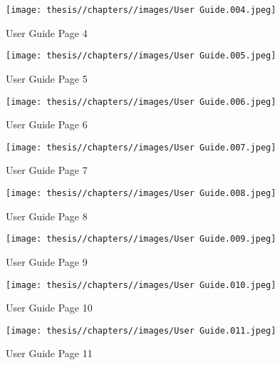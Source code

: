 \begin{figure} [H]
    \centering
    \texttt{[image: thesis//chapters//images/User Guide.004.jpeg]}
    \caption{User Guide Page 4}
 
\end{figure}

\begin{figure} [H]
    \centering
    \texttt{[image: thesis//chapters//images/User Guide.005.jpeg]}
    \caption{User Guide Page 5}
 
\end{figure}

\begin{figure} [H]
    \centering
    \texttt{[image: thesis//chapters//images/User Guide.006.jpeg]}
    \caption{User Guide Page 6}
 
\end{figure}

\begin{figure} [H]
    \centering
    \texttt{[image: thesis//chapters//images/User Guide.007.jpeg]}
    \caption{User Guide Page 7}
 
\end{figure}

\begin{figure} [H]
    \centering
    \texttt{[image: thesis//chapters//images/User Guide.008.jpeg]}
    \caption{User Guide Page 8}
 
\end{figure}

\begin{figure} [H]
    \centering
    \texttt{[image: thesis//chapters//images/User Guide.009.jpeg]}
    \caption{User Guide Page 9}
 
\end{figure}

\begin{figure} [H]
    \centering
    \texttt{[image: thesis//chapters//images/User Guide.010.jpeg]}
    \caption{User Guide Page 10}
 
\end{figure}

\begin{figure} [H]
    \centering
    \texttt{[image: thesis//chapters//images/User Guide.011.jpeg]}
    \caption{User Guide Page 11}
 
\end{figure}

